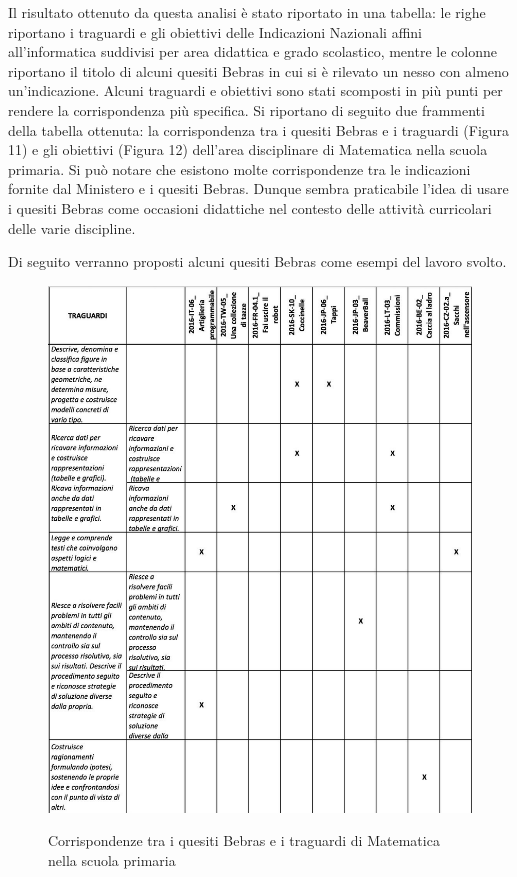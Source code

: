\documentclass[12pt]{report}
\begin{document}
Il risultato ottenuto da questa analisi è stato riportato in una tabella: le righe riportano i traguardi e gli obiettivi delle Indicazioni Nazionali affini all'informatica suddivisi per area didattica e grado scolastico, mentre le colonne riportano il titolo di alcuni quesiti Bebras in cui si è rilevato un nesso con almeno un'indicazione.
Alcuni traguardi e obiettivi sono stati scomposti in più punti per rendere la corrispondenza più specifica.
Si riportano di seguito due frammenti della tabella ottenuta: la corrispondenza tra i quesiti Bebras e i traguardi (Figura 11) e gli obiettivi (Figura 12) dell'area disciplinare di Matematica nella scuola primaria.
Si può notare che esistono molte corrispondenze tra le indicazioni fornite dal Ministero e i quesiti Bebras. 
Dunque sembra praticabile l'idea di usare i quesiti Bebras come occasioni didattiche nel contesto delle attività curricolari delle varie discipline.

Di seguito verranno proposti alcuni quesiti Bebras come esempi del lavoro svolto.

\begin{figure}[H]
	\centering
	\includegraphics[width=15.0cm]{./immagini/02_Cap2/TabellaMatchIndicazioniMate} \label{indicazioniMatematica}
	\caption{Corrispondenze tra i quesiti Bebras e i traguardi di Matematica nella scuola primaria}
\end{figure}
\end{document}
